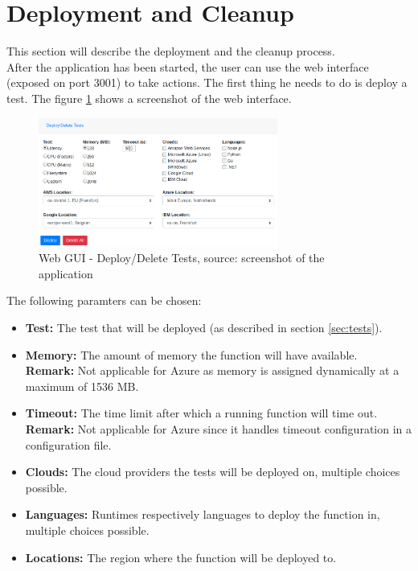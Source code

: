\newpage
\section{Deployment and Cleanup}
This section will describe the deployment and the cleanup process.\\
After the application has been started, the user can use the web interface (exposed on port 3001) to take actions. The first thing he needs to do is deploy a test. The figure \ref{fig:ui} shows a screenshot of the web interface.

\begin{figure}[htp]
\begin{center}
\includegraphics[width=0.7\textwidth]{bilder/ui.png}
\captionsetup{justification=centering, labelfont=bf}
\caption[Web GUI - Deploy/Delete Tests]{Web GUI - Deploy/Delete Tests, source: screenshot of the application}
\label{fig:ui}
\end{center}
\end{figure}

The following paramters can be chosen:
\begin{itemize}
    \item \textbf{Test:} The test that will be deployed (as described in section \ref{sec:tests}).
    \item \textbf{Memory:} The amount of memory the function will have available.\\ \textbf{Remark:} Not applicable for Azure as memory is assigned dynamically at a maximum of 1536 \gls{MB}.
    \item \textbf{Timeout:} The time limit after which a running function will time out.\\ \textbf{Remark:} Not applicable for Azure since it handles timeout configuration in a configuration file.
    \item \textbf{Clouds:} The cloud providers the tests will be deployed on, multiple choices possible.
    \item \textbf{Languages:} Runtimes respectively languages to deploy the function in, multiple choices possible.
    \item \textbf{Locations:} The region where the function will be deployed to.
\end{itemize}

